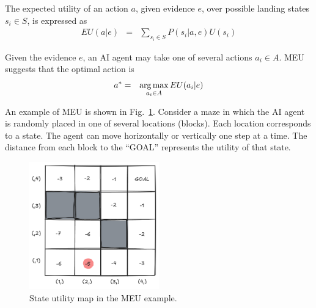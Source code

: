 The expected utility of an action $a$, given evidence $e$, over possible landing states $s_i \in S$, is expressed as
\begin{eqnarray}
	EU(a|e) &=& \sum_{s_i \in S} P(s_i|a,e) U(s_i) \label{eq:expected_utility}
\end{eqnarray}

Given the evidence $e$, an AI agent may take one of several actions $a_i \in A$. MEU suggests that the optimal action is
\begin{eqnarray}
	a^* &=& \operatorname*{arg\,max}_{a_i \in A} EU(a_i|e) \label{eq:emu}
\end{eqnarray}

An example of MEU is shown in Fig.~\ref{fig:emuexp}. Consider a maze in which the AI agent is randomly placed in one of several locations (blocks). Each location corresponds to a state. The agent can move horizontally or vertically one step at a time. The distance from each block to the “GOAL” represents the utility of that state.

\begin{figure}[!htb]
	\centering
	\includegraphics[width=0.5\textwidth]{./chapters/part-1/figures/emuexp.png}
	\caption{State utility map in the MEU example.}
	\label{fig:emuexp}
\end{figure}


